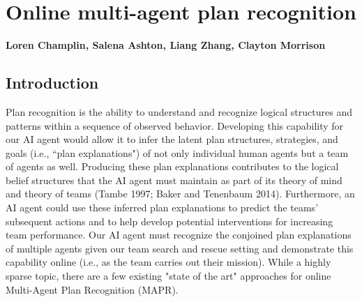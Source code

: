 \chapter{Online multi-agent plan recognition}
\label{ch:plan_recognition}
\textbf{Loren Champlin, Salena Ashton, Liang Zhang, Clayton Morrison}

\section{Introduction}

Plan recognition is the ability to understand and recognize logical structures and patterns within a sequence of observed behavior. Developing this capability for our AI agent would allow it to infer the latent plan structures, strategies, and goals (i.e., ``plan explanations") of not only individual human agents but a team of agents as well. Producing these plan explanations contributes to the logical belief structures that the AI agent must maintain as part of its theory of mind and theory of teams (Tambe 1997; Baker and Tenenbaum 2014). Furthermore, an AI agent could use these inferred plan explanations to predict the teams' subsequent actions and to help develop potential interventions for increasing team performance. Our AI agent must recognize the conjoined plan explanations of multiple agents given our team search and rescue setting and demonstrate this capability online (i.e., as the team carries out their mission). While a highly sparse topic, there are a few existing "state of the art" approaches for online Multi-Agent Plan Recognition (MAPR). 

